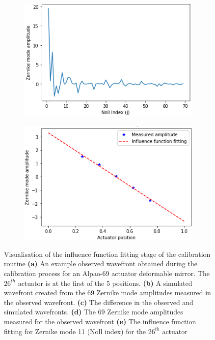 \begin{figure}[h]
	\begin{subfigure}{0.45\textwidth}
		\centering
		\includegraphics[width=1\linewidth, scale=0.5]{images/measured_zernike_modes.png}
		\caption{}
		\label{fig:measured_zernike_modes}
	\end{subfigure}
	\begin{subfigure}{0.45\textwidth}
		\centering
		\includegraphics[width=1\linewidth, scale=0.5]{images/influence_function_11.png}
		\caption{}		
		\label{fig:influence_function_11}
	\end{subfigure}
	\caption[Visualisation of the influence function fitting stage of the calibration routine]{Visualisation of the influence function fitting stage of the calibration routine \textbf{(a)} An example observed wavefront obtained during the calibration process for an Alpao-69 actuator deformable mirror. The $26^{th}$ actuator is at the first of the 5 positions. \textbf{(b)} A simulated wavefront created from the 69 Zernike mode amplitudes measured in the observed wavefront. \textbf{(c)} The difference in the observed and simulated wavefronts. \textbf{(d)} The 69 Zernike mode amplitudes measured for the observed wavefront \textbf{(e)} The influence function fitting for Zernike mode 11 (Noll index) for the $26^{th}$ actuator}
	\label{fig:wavefront_decomposition}
\end{figure}

